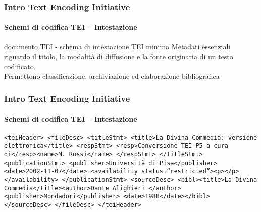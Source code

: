 \begin{frame}
	\frametitle{Intro Text Encoding Initiative}
	\framesubtitle{Schemi di codifica TEI – Intestazione}
	\addtocounter{nframe}{1}

	\begin{block}{documento TEI - schema di intestazione TEI minima}
        Metadati essenziali riguardo il titolo, la modalità di diffusione e
        la fonte originaria di un testo codificato.
        \\Permettono classificazione, archiviazione ed elaborazione
        bibliografica
    \end{block}
    
\end{frame}



\begin{frame}
	\frametitle{Intro Text Encoding Initiative}
	\framesubtitle{Schemi di codifica TEI – Intestazione}
	\addtocounter{nframe}{1}

        \texttt{<teiHeader>
        <fileDesc>
        <titleStmt>
        <title>La Divina Commedia: versione elettronica</title>
        <respStmt>
        <resp>Conversione TEI P5 a cura di</resp><name>M. Rossi</name>
        </respStmt>
        </titleStmt>
        <publicationStmt>
        <publisher>Università di Pisa</publisher>
        <date>2002-11-07</date>
        <availability status=``restricted''><p></p></availability>
        </publicationStmt>
        <sourceDesc>
        <bibl><title>La Divina Commedia</title><author>Dante Alighieri
        </author><publisher>Mondadori</publisher>
        <date>1988</date></bibl>
        </sourceDesc>
        </fileDesc>
        </teiHeader>}

\end{frame}



